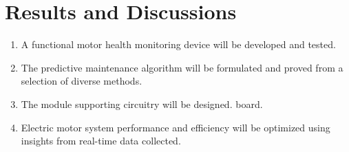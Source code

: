 \section{Results and Discussions }
\begin{enumerate}
\item A functional motor health monitoring device will be developed and tested.
\item The predictive maintenance algorithm will be formulated and proved from a selection
of diverse methods.
\item The module supporting circuitry will be designed.
board.
\item Electric motor system performance and efficiency will be optimized using insights from real-time data collected.
\end{enumerate}
\newpage

